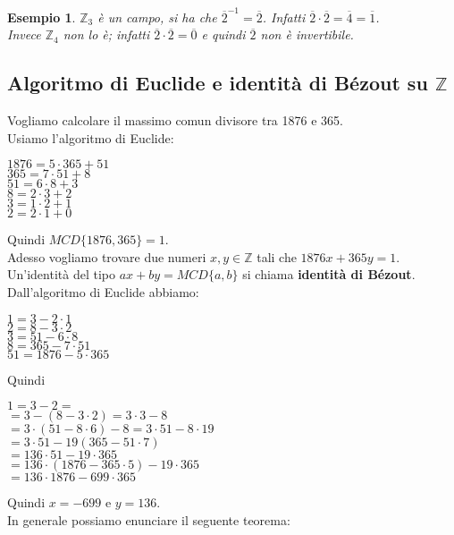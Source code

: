 \documentclass[a4paper,12pt]{article}
\theoremstyle{def}
\theoremstyle{prop}
\theoremstyle{esempio}
\newtheorem*{example}{Esempio}
\theoremstyle{dimostrazione}
\theoremstyle{teo}
\theoremstyle{osservazione}
\begin{document}
\begin{example}
    \(\mathbb{Z}_3\) è un campo, si ha che \(\overline{2}^{-1} = \overline{2}\). Infatti
    \(\overline{2} \cdot \overline{2} = \overline{4} = \overline{1}\).\\Invece \(\mathbb{Z}_4\) non lo è;
    infatti \(\overline{2} \cdot \overline{2} = \overline{0}\) e quindi \(\overline{2}\) non è invertibile.
\end{example}


\subsection{Algoritmo di Euclide e identità di Bézout su \(\mathbb{Z}\)}

Vogliamo calcolare il massimo comun divisore tra 1876 e 365.\\
Usiamo l'algoritmo di Euclide: \\
\begin{center}
    \(1876 = 5 \cdot 365 + 51\)\\
    \(365 = 7 \cdot 51 + 8\)\\
    \(51 = 6 \cdot 8 + 3\)\\
    \(8 = 2 \cdot 3 + 2\)\\
    \(3 = 1 \cdot 2 + 1\)\\
    \(2 = 2 \cdot 1 + 0\)\\
\end{center}

Quindi \(MCD \{1876,365\} = 1\).\\
Adesso vogliamo trovare due numeri \(x,y \in \mathbb{Z} \) tali che \(1876x + 365y = 1\).\\
Un'identità del tipo \(ax + by = MCD \{a,b\}\) si chiama \textbf{identità di Bézout}.\\
Dall'algoritmo di Euclide abbiamo:
\begin{center}
    \(1 = 3 - 2 \cdot 1\)\\
    \(2 = 8 - 3 \cdot 2\)\\
    \(3 = 51 - 6 \cdot 8\)\\
    \(8 = 365 - 7 \cdot 51\)\\
    \(51 = 1876 - 5 \cdot 365\)\\
\end{center}
Quindi\\
\begin{center}
    \(1 = 3 - 2 =\)\\
    \(= 3 - (8 - 3 \cdot 2) = 3 \cdot 3 - 8\)\\
    \(= 3 \cdot (51 - 8 \cdot 6) - 8 = 3 \cdot 51 - 8 \cdot 19\)\\
    \(= 3 \cdot 51 - 19(365 - 51 \cdot 7)\)\\
    \(= 136 \cdot 51 - 19 \cdot 365\)\\
    \(= 136 \cdot (1876 - 365 \cdot 5) - 19 \cdot 365\)\\
    \(= 136 \cdot 1876 - 699 \cdot 365\)\\
\end{center}
Quindi \(x = -699\) e \(y = 136\).\\
In generale possiamo enunciare il seguente teorema:
\end{document}
